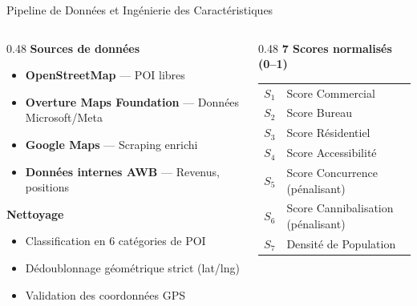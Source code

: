 \documentclass[aspectratio=169, 9pt]{beamer}
\begin{document}
\begin{frame}{Pipeline de Données et Ingénierie des Caractéristiques}
  \vspace{0.1cm}
  \begin{columns}[T]
    \begin{column}{0.48\textwidth}
      {\color{AccentOrange}\faDatabase} \textbf{Sources de données}
      \begin{itemize}
        \item \textbf{OpenStreetMap} --- POI libres
        \item \textbf{Overture Maps Foundation} --- Données Microsoft/Meta
        \item \textbf{Google Maps} --- Scraping enrichi
        \item \textbf{Données internes AWB} --- Revenus, positions
      \end{itemize}
      \vspace{0.3cm}
      {\color{AccentBlue}\faBroom} \textbf{Nettoyage}
      \begin{itemize}
        \item Classification en 6 catégories de POI
        \item Dédoublonnage géométrique strict (lat/lng)
        \item Validation des coordonnées GPS
      \end{itemize}
    \end{column}
    \begin{column}{0.48\textwidth}
      {\color{AccentGreen}\faChartLine} \textbf{7 Scores normalisés (0--1)}

      \vspace{0.15cm}
      \renewcommand{\arraystretch}{1.1}
      {\footnotesize
      \begin{tabular}{@{}l l@{}}
        \color{AccentOrange}$S_1$ & Score Commercial \\
        \color{AccentOrange}$S_2$ & Score Bureau \\
        \color{AccentOrange}$S_3$ & Score Résidentiel \\
        \color{AccentOrange}$S_4$ & Score Accessibilité \\
        \color{AccentOrange}$S_5$ & Score Concurrence {\color{AccentRed}(pénalisant)} \\
        \color{AccentOrange}$S_6$ & Score Cannibalisation {\color{AccentRed}(pénalisant)} \\
        \color{AccentOrange}$S_7$ & Densité de Population \\
      \end{tabular}
      }


\end{column}
\end{columns}
\end{frame}
\end{document}
